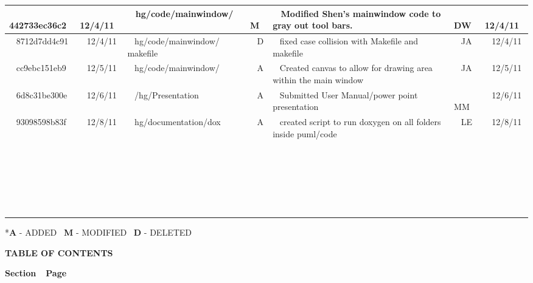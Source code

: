 \documentclass[twoside,letterpaper]{article}
\begin{document}
\begin{flushleft}
\begin{supertabular}{|m{1.0in}|m{0.6in}|p{1.5in}|m{.25in}|m{2.0in}|m{.7in}|m{0.65in}|}
\\\hline
~
442733ec36c2 &
~
12/4/11 &
~
hg/code/mainwindow/  &
~
M &
~
Modified Shen's mainwindow code to gray out tool bars. &
~
DW &
~
12/4/11


\\\hline
~
8712d7dd4c91 &
~
12/4/11 &
~
hg/code/mainwindow/ makefile &
~
D &
~
fixed case collision with Makefile and makefile &
~
JA &
~
12/4/11


\\\hline
~
cc9ebc151eb9 &
~
12/5/11 &
~
hg/code/mainwindow/ &
~
A &
~
Created canvas to allow for drawing area within the main window &
~
JA &
~
12/5/11



\\\hline
~
6d8c31be300e &
~
12/6/11 &
~
/hg/Presentation &
~
A &
~
Submitted User Manual/power point presentation &
~
MM &
~
12/6/11


\\\hline
~
93098598b83f &
~
12/8/11 &
~
hg/documentation/dox &
~
A &
~
created script to run doxygen on all folders inside puml/code &
~
LE &
~
12/8/11

\\\hline
~
 &
~
 &
~
 &
~
 &
~
 &
~
 &
~
\\\hline
~
 &
~
 &
~
 &
~
 &
~
 &
~
 &
~
\\\hline
~
 &
~
 &
~
 &
~
 &
~
 &
~
 &
~
\\\hline
~
 &
~
 &
~
 &
~
 &
~
 &
~
 &
~
\\\hline
~
 &
~
 &
~
 &
~
 &
~
 &
~
 &
~
\\\hline
\end{supertabular}
\end{flushleft}

{\color{black}
\foreignlanguage{english}{*}\foreignlanguage{english}{\textbf{A}}\foreignlanguage{english}{
- ADDED
\ }\foreignlanguage{english}{\textbf{M}}\foreignlanguage{english}{ -
MODIFIED
\ }\foreignlanguage{english}{\textbf{D}}\foreignlanguage{english}{ -
DELETED}}


{\centering{}\bfseries\color{black}
TABLE OF CONTENTS
\par}


\bigskip

{\bfseries\color{black}
Section\ \ Page}
\end{document}
